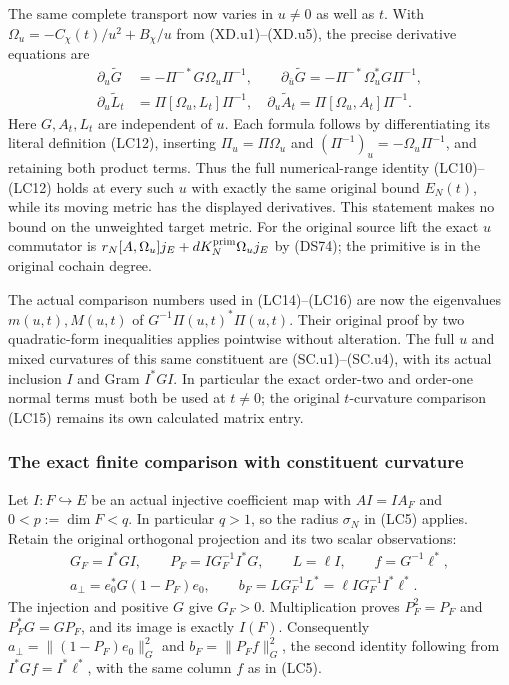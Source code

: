The same complete transport now varies in $u\ne0$ as well as $t$.
With $\Omega_u=-C_\chi(t)/u^2+B_\chi/u$ from (XD.u1)--(XD.u5),
the precise derivative equations are
\[
 \begin{aligned}
 \partial_u\widetilde G&=-\Pi^{-*}G\Omega_u\Pi^{-1},\qquad
 \partial_{\bar u}\widetilde G=-\Pi^{-*}\Omega_u^*G\Pi^{-1},\\
 \partial_u\widetilde L_t&=\Pi[\Omega_u,L_t]\Pi^{-1},
 \quad
 \partial_u\widetilde A_t=\Pi[\Omega_u,A_t]\Pi^{-1}.
 \end{aligned}
 \tag{LC.u1}
\]
Here $G,A_t,L_t$ are independent of $u$.  Each formula follows
by differentiating its literal definition (LC12), inserting
$\Pi_u=\Pi\Omega_u$ and
$(\Pi^{-1})_u=-\Omega_u\Pi^{-1}$, and retaining both product
terms.  Thus the full numerical-range identity (LC10)--(LC12)
holds at every such $u$ with exactly the same original bound
$E_N(t)$, while its moving metric has the displayed derivatives.
This statement makes no bound on the unweighted target metric.
For the original source lift the exact $u$ commutator is
$r_N[A,\Omega_u]j_E+dK_N^{\rm prim}\Omega_u j_E$
by (DS74); the primitive is in the original cochain degree.

The actual comparison numbers used in (LC14)--(LC16) are now
the eigenvalues $m(u,t),M(u,t)$ of
$G^{-1}\Pi(u,t)^*\Pi(u,t)$.  Their original proof by two
quadratic-form inequalities applies pointwise without alteration.
The full $u$ and mixed curvatures of this same constituent are
(SC.u1)--(SC.u4), with its actual inclusion $I$ and Gram $I^*GI$.
In particular the exact order-two and order-one normal terms
must both be used at $t\ne0$; the original $t$-curvature
comparison (LC15) remains its own calculated matrix entry.

\subsubsection{The exact finite comparison with constituent curvature}

Let $I:F\hookrightarrow E$ be an actual injective coefficient map
with $AI=IA_F$ and $0<p:=\dim F<q$. In particular $q>1$, so
the radius $\sigma_N$ in (LC5) applies. Retain the original
orthogonal projection and its two scalar observations:
\[
\begin{gathered}
 G_F=I^*GI,\qquad P_F=I G_F^{-1}I^*G,\qquad L=\ell I,\qquad
 f=G^{-1}\ell^*,\\
 a_\perp=e_0^*G(1-P_F)e_0,\qquad
 b_F=L G_F^{-1}L^*=\ell I G_F^{-1}I^*\ell^*.
\end{gathered}\tag{LC13}
\]
The injection and positive $G$ give $G_F>0$. Multiplication proves
$P_F^2=P_F$ and $P_F^*G=GP_F$, and its image is exactly $I(F)$.
Consequently $a_\perp=\|(1-P_F)e_0\|_G^2$ and
$b_F=\|P_Ff\|_G^2$, the second identity following from
$I^*Gf=I^*\ell^*$, with the same column $f$ as in (LC5).

